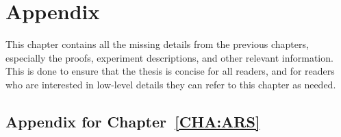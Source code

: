 
\chapter{Appendix}
\label{cha:appendix}

This chapter contains all the missing details from the previous chapters,
especially the proofs, experiment descriptions, and other relevant information.
This is done to ensure that the thesis is concise for all readers, and for
readers who are interested in low-level details they can refer to this chapter
as needed.

\section{Appendix for Chapter~\ref{CHA:ARS}}
\label{sec:append-chapt-ars}

